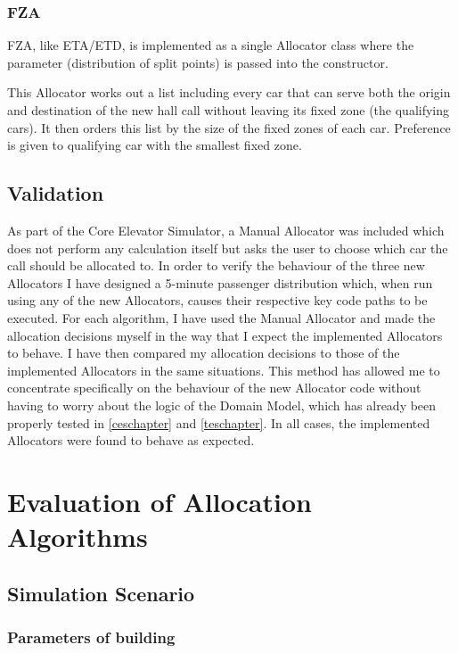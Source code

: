 \documentclass{UoYCSproject}
\begin{document}
\subsection{FZA}

FZA, like ETA/ETD, is implemented as a single Allocator class where the parameter (distribution of split points) is passed into the constructor.

This Allocator works out a list including every car that can serve both the origin and destination of the new hall call without leaving its fixed zone (the qualifying cars).  It then orders this list by the size of the fixed zones of each car.  Preference is given to qualifying car with the smallest fixed zone.

\section{Validation}

As part of the Core Elevator Simulator, a Manual Allocator was included which does not perform any calculation itself but asks the user to choose which car the call should be allocated to.  In order to verify the behaviour of the three new Allocators I have designed a 5-minute passenger distribution which, when run using any of the new Allocators, causes their respective key code paths to be executed.  For each algorithm, I have used the Manual Allocator and made the allocation decisions myself in the way that I expect the implemented Allocators to behave.  I have then compared my allocation decisions to those of the implemented Allocators in the same situations.  This method has allowed me to concentrate specifically on the behaviour of the new Allocator code without having to worry about the logic of the Domain Model, which has already been properly tested in \autoref{ceschapter} and \autoref{teschapter}.  In all cases, the implemented Allocators were found to behave as expected.

\chapter{Evaluation of Allocation Algorithms}
\label{algevaluation}

\section{Simulation Scenario}

\subsection{Parameters of building}
\end{document}

